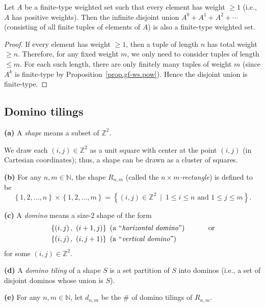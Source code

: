 \begin{lemma}
\label{lem.gf-ws.tuples-finite-type}
\leanhelper
\leanok
Let $A$ be a finite-type weighted set such that every element has weight
$\geq 1$ (i.e., $A$ has positive weights). Then the infinite disjoint union
$A^0 + A^1 + A^2 + \cdots$ (consisting of all finite tuples of elements of
$A$) is also a finite-type weighted set.
\end{lemma}

\begin{proof}
\leanok
If every element has weight $\geq 1$, then a tuple of length $n$ has total
weight $\geq n$. Therefore, for any fixed weight $m$, we only need to consider
tuples of length $\leq m$. For each such length, there are only finitely many
tuples of weight $m$ (since $A^k$ is finite-type by
Proposition~\ref{prop.gf-ws.pow}). Hence the disjoint union is finite-type.
\end{proof}

\subsection{Domino tilings}

\begin{definition}
\label{def.domino.shapes-and-tilings}
\leantarget
\leanok
\textbf{(a)} A \emph{shape} means a
subset of $\mathbb{Z}^{2}$.

We draw each $\left(  i,j\right)  \in\mathbb{Z}^{2}$ as a unit square with
center at the point $\left(  i,j\right)  $ (in Cartesian coordinates); thus, a
shape can be drawn as a cluster of squares. \medskip

\textbf{(b)} For any $n,m\in\mathbb{N}$, the shape $R_{n,m}$ (called the
$n\times m$\emph{-rectangle}) is defined to be%
\[
\left\{  1,2,\ldots,n\right\}  \times\left\{  1,2,\ldots,m\right\}  =\left\{
\left(  i,j\right)  \in\mathbb{Z}^{2}\ \mid\ 1\leq i\leq n\text{ and }1\leq
j\leq m\right\}  .
\]

\textbf{(c)} A \emph{domino} means a size-$2$ shape of the form%
\begin{align*}
&  \left\{  \left(  i,j\right)  ,\ \left(  i+1,j\right)  \right\}  \text{ (a
``\emph{horizontal domino}'')}%
\ \ \ \ \ \ \ \ \ \ \text{or}\\
&  \left\{  \left(  i,j\right)  ,\ \left(  i,j+1\right)  \right\}  \text{ (a
``\emph{vertical domino}'')}%
\end{align*}
for some $\left(  i,j\right)  \in\mathbb{Z}^{2}$. \medskip

\textbf{(d)} A \emph{domino tiling} of a shape $S$ is a set partition of $S$
into dominos (i.e., a set of disjoint dominos whose union is $S$). \medskip

\textbf{(e)} For any $n,m\in\mathbb{N}$, let $d_{n,m}$ be the \# of domino
tilings of $R_{n,m}$.
\end{definition}


